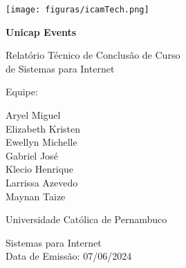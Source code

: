 \documentclass[12pt]{report}
\begin{document}
\newcommand{\titulo}{Unicap Events}
\newcommand{\nombreestudiante}{Aryel Miguel\\Elizabeth Kristen\\Ewellyn Michelle\\Gabriel José\\Klecio Henrique\\Larrissa Azevedo\\Maynan Taize\\}
\newcommand{\fecha}{\date{\today}}


\begin{titlepage}
	\centering
	\texttt{[image: figuras/icamTech.png]}\par
	\vspace{1cm}
	{\LARGE\bfseries \titulo \par}
	\vfill
	{\large Relatório Técnico de Conclusão de Curso\\de Sistemas para Internet\par

	\vfill
	Equipe:\par\vspace{2mm}
	\nombreestudiante\par
    \vfill
    Universidade Católica de Pernambuco\par
    Sistemas para Internet \\ Data de Emissão: 07/06/2024
	\date{\today}
 \par}
\end{titlepage}

\tableofcontents
\listoffigures







\printbibliography[heading=bibintoc, title={Referencias}]
\end{document}
